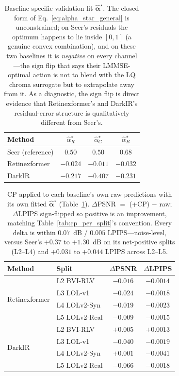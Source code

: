\begin{table}[h]
\centering\small\setlength{\tabcolsep}{4pt}
\begin{tabular}{lccc}
\toprule
Method & $\widehat{\alpha}^{\star}_R$ & $\widehat{\alpha}^{\star}_G$ & $\widehat{\alpha}^{\star}_B$ \\
\midrule
Seer (reference)      & $0.50$ & $0.50$ & $0.68$ \\
Retinexformer          & $-0.024$ & $-0.011$ & $-0.032$ \\
DarkIR                 & $-0.217$ & $-0.407$ & $-0.231$ \\
\bottomrule
\end{tabular}
\caption{Baseline-specific validation-fit $\widehat{\boldsymbol{\alpha}}^{\star}$. The closed form of Eq.~\eqref{eq:alpha_star_general} is unconstrained; on Seer's residuals the optimum happens to lie inside $[0,1]$ (a genuine convex combination), and on these two baselines it is \emph{negative} on every channel---the sign flip that says their LMMSE-optimal action is not to blend with the LQ chroma surrogate but to extrapolate away from it. As a diagnostic, the sign flip is direct evidence that Retinexformer's and DarkIR's residual-error structure is qualitatively different from Seer's.}
\label{tab:cp_transfer_alpha}
\end{table}

\begin{table}[h]
\centering\scriptsize\setlength{\tabcolsep}{3pt}
\begin{tabular}{llcc}
\toprule
Method & Split & $\Delta$PSNR & $\Delta$LPIPS \\
\midrule
\multirow{4}{*}{Retinexformer} & L2 BVI-RLV & $-0.016$ & $-0.0014$ \\
 & L3 LOL-v1 & $-0.024$ & $-0.0018$ \\
 & L4 LOLv2-Syn & $-0.019$ & $-0.0023$ \\
 & L5 LOLv2-Real & $-0.009$ & $-0.0015$ \\
\midrule
\multirow{4}{*}{DarkIR} & L2 BVI-RLV & $+0.005$ & $+0.0013$ \\
 & L3 LOL-v1 & $-0.040$ & $-0.0019$ \\
 & L4 LOLv2-Syn & $+0.001$ & $-0.0041$ \\
 & L5 LOLv2-Real & $-0.066$ & $-0.0018$ \\
\bottomrule
\end{tabular}
\caption{CP applied to each baseline's own raw predictions with its own fitted $\widehat{\boldsymbol{\alpha}}^{\star}$ (Table~\ref{tab:cp_transfer_alpha}). $\Delta$PSNR $=$ (+CP) $-$ raw; $\Delta$LPIPS sign-flipped so positive is an improvement, matching Table~\ref{tab:cp_per_split}'s convention. Every delta is within $0.07$~dB / $0.005$ LPIPS---noise-level, versus Seer's $+0.37$ to $+1.30$~dB on its net-positive splits (L2--L4) and $+0.031$ to $+0.044$ LPIPS across L2--L5.}
\label{tab:cp_transfer_delta}
\end{table}


